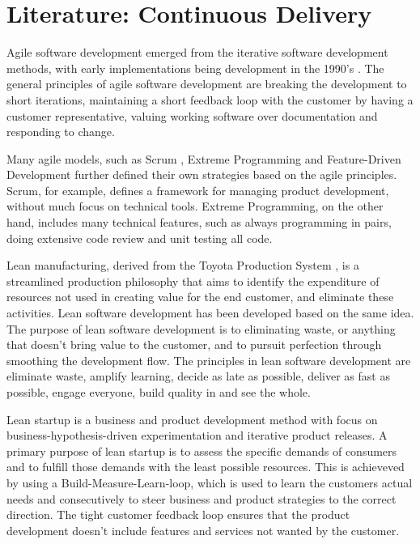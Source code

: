 \documentclass[english]{tktltiki2}
\theoremstyle{definition}
\theoremstyle{remark}
\begin{document}
\section{Literature: Continuous Delivery}
Agile software development emerged from the iterative software development methods, with early implementations being development in the 1990's \cite{dybaa2008empirical}. The general principles of agile software development are breaking the development to short iterations, maintaining a short feedback loop with the customer by having a customer representative, valuing working software over documentation and responding to change.

Many agile models, such as Scrum \cite{schwaber2002gile}, Extreme Programming \cite{beck2000extreme} and Feature-Driven Development \cite{palmer2001practical} further defined their own strategies based on the agile principles. Scrum, for example, defines a framework for managing product development, without much focus on technical tools. Extreme Programming, on the other hand, includes many technical features, such as always programming in pairs, doing extensive code review and unit testing all code.

Lean manufacturing, derived from the Toyota Production System \cite{ono1988toyota}, is a streamlined production philosophy that aims to identify the expenditure of resources not used in creating value for the end customer, and eliminate these activities. Lean software development \cite{poppendieck2003lean} has been developed based on the same idea. The purpose of lean software development is to eliminating waste, or anything that doesn't bring value to the customer, and to pursuit perfection through smoothing the development flow. The principles in lean software development are eliminate waste, amplify learning, decide as late as possible, deliver as fast as possible, engage everyone, build quality in and see the whole. 

Lean startup \cite{ries2011lean} is a business and product development method with focus on business-hypothesis-driven experimentation and iterative product releases. A primary purpose of lean startup is to assess the specific demands of consumers and to fulfill those demands with the least possible resources. This is achieveved by using a Build-Measure-Learn-loop, which is used to learn the customers actual needs and consecutively to steer business and product strategies to the correct direction. The tight customer feedback loop ensures that the product development doesn't include features and services not wanted by the customer. 
\end{document}
